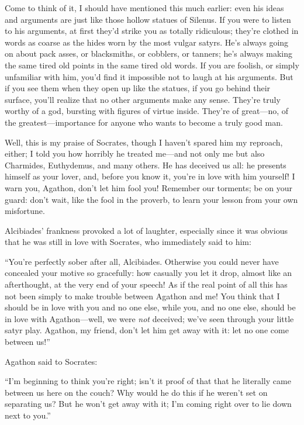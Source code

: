 Come to think of it, I should have mentioned this much earlier: even his
ideas and arguments are just like those hollow statues of Silenus. If
 you were to listen to his arguments, at first they’d strike you
as totally ridiculous; they’re clothed in words as coarse as the hides
worn by the most vulgar satyrs. He’s always going on about pack asses,
or blacksmiths, or cobblers, or tanners; he’s always making the same
tired old points in the same tired old words. If you are foolish, or
simply unfamiliar with him, you’d find it impossible not to laugh at his
arguments. But if you  see them when they open up like
the statues, if you go behind their surface, you’ll realize that no
other arguments make any sense. They’re truly worthy of a god, bursting
with figures of virtue inside. They’re of great---no, of the
greatest---importance for anyone who wants to become a truly good man.

Well, this is my praise of Socrates, though I haven’t spared him my
 reproach, either; I told you how horribly he treated me---and
not only me but also Charmides, Euthydemus, and many others. He has
deceived us all: he presents himself as your lover, and, before you know
it, you’re in love with him yourself! I warn you, Agathon, don’t let him
fool you! Remember our torments; be on your guard: don’t wait, like the
fool in the  proverb, to learn your lesson from your own
misfortune.

\blank[line]

Alcibiades’ frankness provoked a lot of laughter, especially since it
was obvious that he was still in love with Socrates, who immediately
said to him:

“You’re perfectly sober after all, Alcibiades. Otherwise you could never
have concealed your motive so gracefully: how casually you let it drop,
almost like an afterthought, at the very end of your speech! As if the
real  point of all this has not been simply to make trouble
between Agathon and me! You think that I should be in love with you and
no one else, while you, and no one else, should be in love with
Agathon---well, we were {\em not} deceived; we’ve seen through your
little satyr play. Agathon, my friend, don’t let him get away with it:
let no one come between us!”

Agathon said to Socrates:

 “I’m beginning to think you’re right; isn’t it proof of that
that he literally came between us here on the couch? Why would he do
this if he weren’t set on separating us? But he won’t get away with it;
I’m coming right over to lie down next to you.”


